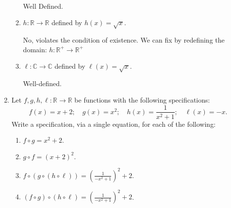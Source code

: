 \documentclass[12pt]{article}
\newcommand{\R}{\mathbb{R}}
\newcommand{\C}{\mathbb{C}}
\begin{document}
\begin{enumerate}
\begin{enumerate}
Well Defined. 
\item $h:\R\to\R$ defined by $h(x)=\sqrt{x}$.

No, violates the condition of existence. We can fix by redefining the domain: $h:\R^+ \to \R^+$
\item $\ell:\C\to \C$ defined by $\ell(x)=\sqrt{x}$.

Well-defined. 
\end{enumerate}

\item Let $f, g, h, \ell: \R\to \R$ be functions with the following specifications:
\[ f(x)=x+2;\quad g(x)=x^2; \quad h(x)=\frac{1}{x^2+1}; \quad \ell(x)=-x.\]
Write a specification, via a single equation, for each of the following:
\begin{enumerate}
\item $f\circ g = x^2 + 2$.
\item $g\circ f = (x+2)^2$.
\item $f\circ(g\circ(h\circ \ell)) = (\frac{1}{-x^2 + 1})^2 + 2$.
\item $(f\circ g)\circ (h\circ \ell) = (\frac{1}{-x^2 + 1})^2 + 2$.
\end{enumerate}

\end{enumerate}
\end{document}
